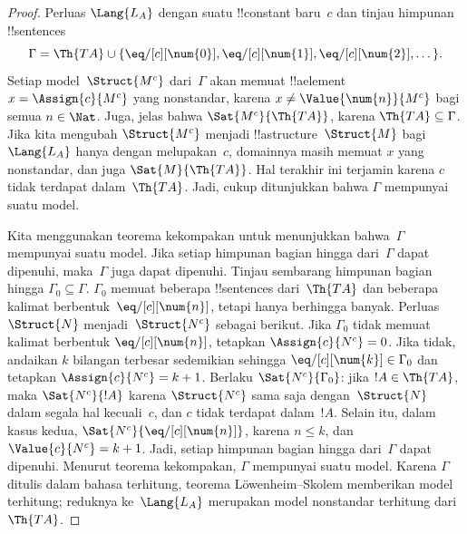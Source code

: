 \documentclass[../../../include/open-logic-section]{subfiles}
\begin{document}
\begin{proof}
Perluas $\Lang{L_A}$ dengan suatu !!{constant} baru~$c$ dan tinjau himpunan
!!{sentence}s
\[
\Gamma = \Th{TA} \cup \{\eq/[c][\num{0}], \eq/[c][\num{1}],
\eq/[c][\num{2}], \dots\}.
\]
Setiap model~$\Struct{M^c}$ dari~$\Gamma$ akan memuat !!a{element}
$x = \Assign{c}{M^c}$ yang nonstandar, karena
$x \neq \Value{\num{n}}{M^c}$ bagi semua $n \in \Nat$. Juga, jelas bahwa
$\Sat{M^c}{\Th{TA}}$, karena $\Th{TA} \subseteq \Gamma$. Jika kita mengubah
$\Struct{M^c}$ menjadi !!a{structure}~$\Struct{M}$ bagi $\Lang{L_A}$ hanya
dengan melupakan~$c$, domainnya masih memuat $x$ yang nonstandar, dan juga
$\Sat{M}{\Th{TA}}$. Hal terakhir ini terjamin karena $c$ tidak terdapat
dalam~$\Th{TA}$. Jadi, cukup ditunjukkan bahwa $\Gamma$ mempunyai suatu
model.

Kita menggunakan teorema kekompakan untuk menunjukkan bahwa~$\Gamma$
mempunyai suatu model. Jika setiap himpunan bagian hingga dari~$\Gamma$ dapat
dipenuhi, maka~$\Gamma$ juga dapat dipenuhi. Tinjau sembarang himpunan bagian
hingga $\Gamma_0 \subseteq \Gamma$. $\Gamma_0$ memuat beberapa !!{sentence}s
dari~$\Th{TA}$ dan beberapa kalimat berbentuk~$\eq/[c][\num{n}]$, tetapi
hanya berhingga banyak. Perluas~$\Struct{N}$ menjadi~$\Struct{N^c}$ sebagai
berikut. Jika $\Gamma_0$ tidak memuat kalimat berbentuk
$\eq/[c][\num{n}]$, tetapkan $\Assign{c}{N^c}=0$. Jika tidak, andaikan $k$
bilangan terbesar sedemikian sehingga $\eq/[c][\num{k}] \in \Gamma_0$ dan
tetapkan $\Assign{c}{N^c} = k+1$. Berlaku $\Sat{N^c}{\Gamma_0}$: jika
$!A \in \Th{TA}$, maka $\Sat{N^c}{!A}$ karena $\Struct{N^c}$ sama saja
dengan~$\Struct{N}$ dalam segala hal kecuali~$c$, dan $c$ tidak terdapat
dalam~$!A$. Selain itu, dalam kasus kedua,
$\Sat{N^c}{\eq/[c][\num{n}]}$, karena $n \le k$, dan
$\Value{c}{N^c} = k+1$. Jadi, setiap himpunan bagian hingga dari~$\Gamma$
dapat dipenuhi. Menurut teorema kekompakan, $\Gamma$ mempunyai suatu model.
Karena $\Gamma$ ditulis dalam bahasa terhitung, teorema L\"owenheim--Skolem
memberikan model terhitung; reduknya ke~$\Lang{L_A}$ merupakan model
nonstandar terhitung dari~$\Th{TA}$.
\end{proof}
\end{document}
